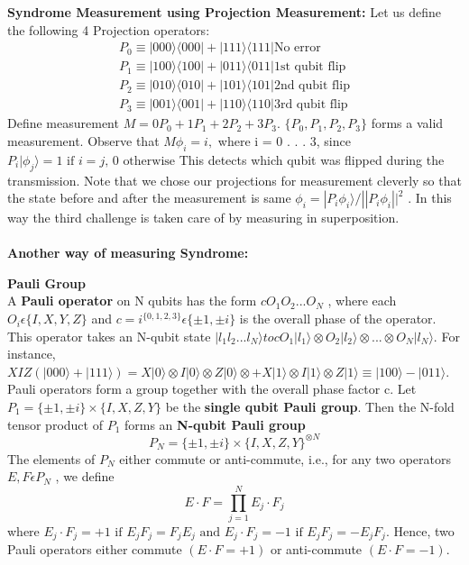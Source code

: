 \documentclass[12pt]{report}
\begin{document}
\textbf{Syndrome Measurement using Projection Measurement:}
Let us define the following 4 Projection operators:
\begin{equation*}
\begin{split}
	P_0 \equiv |000\rangle \langle000| + |111\rangle \langle111| 	\text{No error}\\
	P_1 \equiv |100\rangle \langle100| + |011\rangle \langle011|	\text{1st qubit flip}\\
	P_2 \equiv |010\rangle \langle010| + |101\rangle \langle101|	\text{2nd qubit flip}\\
	P_3 \equiv |001\rangle \langle001| + |110\rangle \langle110|	\text{3rd qubit flip}
\end{split}
\end{equation*}
Define measurement $M = 0P_0 + 1P_1 + 2P_2 + 3P_3$. $\{P_0, P_1, P_2, P_3\}$ forms a valid measurement. Observe that $M\phi_i = i,$   where i = 0 . . . 3, since $P_i|\phi_j\rangle = 1 \text{ if } i = j \text{, }0 \text{ otherwise}$
This detects which qubit was flipped during the transmission. Note that we chose our projections for measurement cleverly so that the state before and after the measurement is same $\phi_i =|P_i\phi_i\rangle/||P_i\phi_i||^2$ . In this way the third challenge is taken care of by measuring in superposition.\\ \\
\textbf{Another way of measuring Syndrome:}\\
\begin{defn1}\textbf{Pauli Group}\\
A \textbf{Pauli operator} on N qubits has the form $cO_1O_2 ... O_N$ , where each $O_i\epsilon\{I, X, Y, Z \}$ and $c = i^{\{0,1,2,3\}} \epsilon \{\pm 1, \pm i\}$ is the overall phase of the operator.\\
This operator takes an N-qubit state $|l_1l_2...l_N\rangle to cO_1|l_1\rangle \otimes O_2|l_2\rangle\otimes...\otimes O_N |l_N\rangle$. For instance, $XIZ(|000\rangle+|111\rangle) = X|0\rangle\otimes I|0\rangle\otimes Z|0\rangle\otimes+X|1\rangle\otimes I|1\rangle\otimes Z|1\rangle \equiv |100\rangle - |011\rangle$. \\
Pauli operators form a group together with the overall phase factor c. Let $P_1 = \{\pm1, \pm i\} \times \{I, X, Z, Y \}$ be the \textbf{single qubit Pauli group}. Then the N-fold tensor product of $P_1$ forms an \textbf{N-qubit Pauli group} 
\begin{equation}P_N = \{\pm1, \pm i\} \times \{I, X, Z, Y \}^{\otimes N} \end{equation}
The elements of $P_N$ either commute or anti-commute, i.e., for any two operators $E, F \epsilon P_N$ , we define \begin{equation}E \cdot F = \prod_{j=1}^{N} E_j \cdot F_j \end{equation}
where $E_j\cdot F_j = +1 \text{ if } E_jF_j = F_jE_j \text{ and } E_j \cdot F_j = -1 \text{ if } E_jF_j = -E_jF_j$. Hence, two Pauli operators either commute $(E \cdot F = +1)$ or anti-commute $(E \cdot F = -1)$.
\end{defn1}
\end{document}
